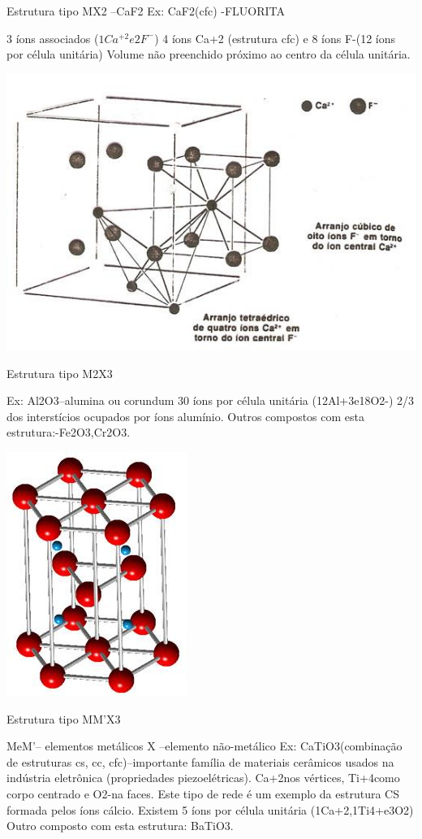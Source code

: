  Estrutura tipo MX2 –CaF2
 Ex: CaF2(cfc) -FLUORITA
 
3 íons associados ($1Ca^{+2} e 2F^{-}$)
4 íons Ca+2 (estrutura cfc) e 8 íons F-(12 íons por célula unitária)
Volume não preenchido próximo ao centro da célula unitária.

\includegraphics[scale=0.3,trim={0 0 0 0}]{figures/CaF2}

Estrutura tipo M2X3

Ex: Al2O3–alumina ou corundum
30 íons por célula unitária (12Al+3e18O2-)
2/3 dos interstícios ocupados por íons alumínio.
Outros compostos com esta estrutura:-Fe2O3,Cr2O3.
  
\includegraphics[scale=0.5,trim={0 0 0 0}]{figures/Al2O3}

Estrutura tipo MM'X3

 MeM'– elementos metálicos
 X –elemento não-metálico
 Ex: CaTiO3(combinação de estruturas cs, cc, cfc)–importante família de materiais cerâmicos usados na indústria eletrônica (propriedades piezoelétricas).
 Ca+2nos vértices, Ti+4como corpo centrado e O2-na faces.
 Este tipo de rede é um exemplo da estrutura CS formada pelos íons cálcio.
 Existem 5 íons por célula unitária (1Ca+2,1Ti4+e3O2)
 Outro composto com esta estrutura: BaTiO3.
 
